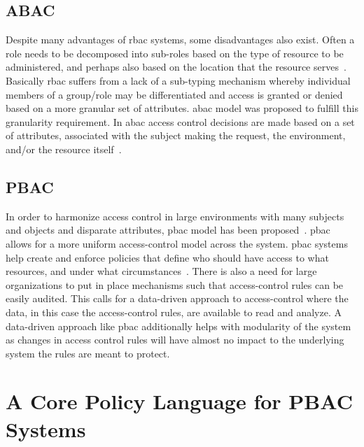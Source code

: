 \subsection{ABAC}

Despite many advantages of \ac{rbac} systems, some disadvantages also exist. Often a role needs to be decomposed into sub-roles based on the type of resource to be administered, and perhaps also based on the location that the resource serves~\cite{nist}. Basically \ac{rbac} suffers from a lack of a sub-typing mechanism whereby individual members of a group/role may be differentiated and access is granted or denied based on a more granular set of attributes. \ac{abac} model was proposed to fulfill this granularity requirement. In \ac{abac} access control decisions are made based on a set of attributes, associated with the subject making the request, the environment, and/or the resource itself~\cite{nist}. 

\subsection{PBAC}
In order to harmonize access control in large environments with many subjects and objects and disparate attributes, \ac{pbac} model has been proposed~\cite{nist}. \ac{pbac} allows for a more uniform access-control model across the system. \ac{pbac} systems help create and enforce policies
that define who should have access to what resources, and under what circumstances~\cite{nist}.
There is also a need for large organizations to put in place mechanisms such that access-control rules can be easily audited. This calls for a data-driven approach to access-control where the data, in this case the access-control rules, are available to read and analyze. A data-driven approach like \ac{pbac} additionally helps with modularity of the system as changes in access control rules will have almost no impact to the underlying system the rules are meant to protect.

\section{A Core Policy Language for PBAC Systems} 


